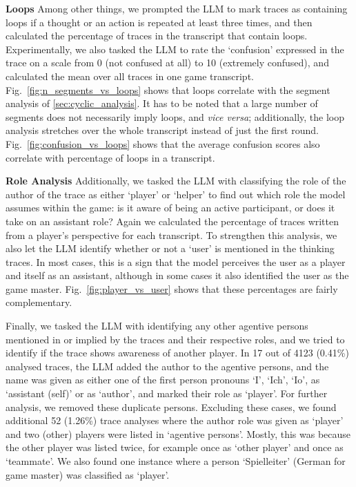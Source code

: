 \documentclass[../main.tex]{subfiles}
\begin{document}
\textbf{Loops}
Among other things, we prompted the LLM to mark traces as containing loops if a thought or an action is repeated at least three times, and then calculated the percentage of traces in the transcript that contain loops. Experimentally, we also tasked the LLM to rate the `confusion' expressed in the trace on a scale from 0 (not confused at all) to 10 (extremely confused), and calculated the mean over all traces in one game transcript. Fig.~\ref{fig:n_segments_vs_loops} shows that loops correlate with the segment analysis of \ref{sec:cyclic_analysis}. It has to be noted that a large number of segments does not necessarily imply loops, and \textit{vice versa}; additionally, the loop analysis stretches over the whole transcript instead of just the first round. Fig.~\ref{fig:confusion_vs_loops} shows that the average confusion scores also correlate with percentage of loops in a transcript.

\textbf{Role Analysis}
Additionally, we tasked the LLM with classifying the role of the author of the trace as either `player' or `helper' to find out which role the model assumes within the game: is it aware of being an active participant, or does it take on an assistant role? Again we calculated the percentage of traces written from a player's perspective for each transcript.
To strengthen this analysis, we also let the LLM identify whether or not a `user' is mentioned in the thinking traces. In most cases, this is a sign that the model perceives the user as a player and itself as an assistant, although in some cases it also identified the user as the game master. Fig.~\ref{fig:player_vs_user} shows that these percentages are fairly complementary.

Finally, we tasked the LLM with identifying any other agentive persons mentioned in or implied by the traces and their respective roles, and we tried to identify if the trace shows awareness of another player.
In 17 out of 4123 (0.41\%) analysed traces, the LLM added the author to the agentive persons, and the name was given as either one of the first person pronouns `I', `Ich', `Io', as `assistant (self)' or as `author', and marked their role as `player'. For further analysis, we removed these duplicate persons.
Excluding these cases, we found additional 52 (1.26\%) trace analyses where the author role was given as `player' and two (other) players were listed in `agentive persons'. Mostly, this was because the other player was listed twice, for example once as `other player' and once as `teammate'. We also found one instance where a person `Spielleiter' (German for game master) was classified as `player'.
\end{document}
